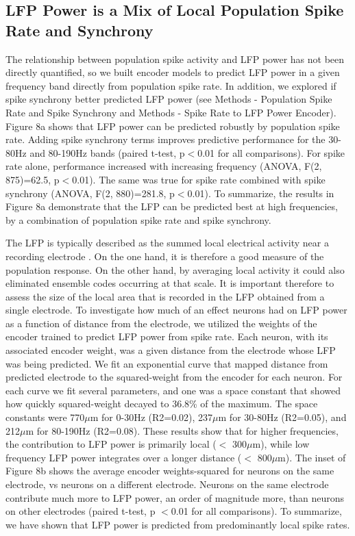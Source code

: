\subsection{LFP Power is a Mix of Local Population Spike Rate and Synchrony}

    The relationship between population spike activity and LFP power has not been directly quantified, so we built encoder models to predict LFP power in a given frequency band directly from population spike rate. In addition, we explored if spike synchrony better predicted LFP power (see Methods - Population Spike Rate and Spike Synchrony and Methods - Spike Rate to LFP Power Encoder). Figure 8a shows that LFP power can be predicted robustly by population spike rate. Adding spike synchrony terms improves predictive performance for the 30-80Hz and 80-190Hz bands (paired t-test, p$<$0.01 for all comparisons). For spike rate alone, performance increased with increasing frequency (ANOVA, F(2, 875)=62.5, p$<$0.01). The same was true for spike rate combined with spike synchrony (ANOVA, F(2, 880)=281.8, p$<$0.01). To summarize, the results in Figure 8a demonstrate that the LFP can be predicted best at high frequencies, by a combination of population spike rate and spike synchrony. 

The LFP is typically described as the summed local electrical activity near a recording electrode \cite{Buzsaki2012b}. On the one hand, it is therefore a good measure of the population response. On the other hand, by averaging local activity it could also eliminated ensemble codes occurring at that scale. It is important therefore to assess the size of the local area that is recorded in the LFP obtained from a single electrode. To investigate how much of an effect neurons had on LFP power as a function of distance from the electrode, we utilized the weights of the encoder trained to predict LFP power from spike rate. Each neuron, with its associated encoder weight, was a given distance from the electrode whose LFP was being predicted. We fit an exponential curve that mapped distance from predicted electrode to the squared-weight from the encoder for each neuron. For each curve we fit several parameters, and one was a space constant that showed how quickly squared-weight decayed to 36.8\% of the maximum. The space constants were 770$\mu$m for 0-30Hz (R2=0.02), 237$\mu$m for 30-80Hz (R2=0.05), and 212$\mu$m for 80-190Hz (R2=0.08). These results show that for higher frequencies, the contribution to LFP power is primarily local ($<$ 300$\mu$m), while low frequency LFP power integrates over a longer distance ($<$ 800$\mu$m). The inset of Figure 8b shows the average encoder weights-squared for neurons on the same electrode, vs neurons on a different electrode. Neurons on the same electrode contribute much more to LFP power, an order of magnitude more, than neurons on other electrodes (paired t-test, p $<$0.01 for all comparisons). To summarize, we have shown that LFP power is predicted from predominantly local spike rates.

